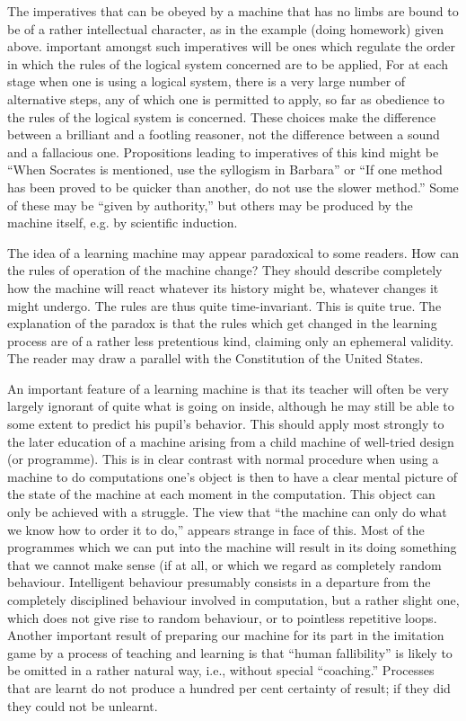 \documentclass[10pt,twoside,openright]{memoir}
\begin{document}
The imperatives that can be obeyed by a machine that has no limbs are bound to be of a rather intellectual character, as in the example (doing homework) given above. important amongst such imperatives will be ones which regulate the order in which the rules of the logical system concerned are to be applied, For at each stage when one is using a logical system, there is a very large number of alternative steps, any of which one is permitted to apply, so far as obedience to the rules of the logical system is concerned. These choices make the difference between a brilliant and a footling reasoner, not the difference between a sound and a fallacious one. Propositions leading to imperatives of this kind might be ``When Socrates is mentioned, use the syllogism in Barbara'' or ``If one method has been proved to be quicker than another, do not use the slower method.'' Some of these may be ``given by authority,'' but others may be produced by the machine itself, e.g. by scientific induction.

The idea of a learning machine may appear paradoxical to some readers. How can the rules of operation of the machine change? They should describe completely how the machine will react whatever its history might be, whatever changes it might undergo. The rules are thus quite time-invariant. This is quite true. The explanation of the paradox is that the rules which get changed in the learning process are of a rather less pretentious kind, claiming only an ephemeral validity. The reader may draw a parallel with the Constitution of the United States.

An important feature of a learning machine is that its teacher will often be very largely ignorant of quite what is going on inside, although he may still be able to some extent to predict his pupil's behavior. This should apply most strongly to the later education of a machine arising from a child machine of well-tried design (or programme). This is in clear contrast with normal procedure when using a machine to do computations one's object is then to have a clear mental picture of the state of the machine at each moment in the computation. This object can only be achieved with a struggle. The view that ``the machine can only do what we know how to order it to do,'' appears strange in face of this. Most of the programmes which we can put into the machine will result in its doing something that we cannot make sense (if at all, or which we regard as completely random behaviour. Intelligent behaviour presumably consists in a departure from the completely disciplined behaviour involved in computation, but a rather slight one, which does not give rise to random behaviour, or to pointless repetitive loops. Another important result of preparing our machine for its part in the imitation game by a process of teaching and learning is that ``human fallibility'' is likely to be omitted in a rather natural way, i.e., without special ``coaching.'' Processes that are learnt do not produce a hundred per cent certainty of result; if they did they could not be unlearnt.
\end{document}
